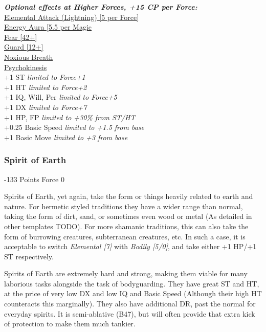 \begin{multicols*}{3}
	\textbf{\textit{Optional effects at Higher Forces, +15 CP per Force:\\}}
	\hyperref[elemental_attack]{Elemental Attack (Lightning) [5 per Force]}\\
	\hyperref[energy_aura]{Energy Aura [5.5 per Magic}\\
	\hyperref[fear]{Fear [42+]}\\
	\hyperref[guard]{Guard [12+]}\\
	\hyperref[noxious_breath]{Noxious Breath}\\
	\hyperref[psychokinesis]{Psychokinesis}\\
	
	+1 ST \textit{limited to Force+1}\\
	+1 HT \textit{limited to Force+2}\\
	+1 IQ, Will, Per \textit{limited to Force+5}\\
	+1 DX \textit{limited to Force+7}\\
	+1 HP, FP \textit{limited to +30\% from ST/HT}\\
	+0.25 Basic Speed \textit{limited to +1.5 from base}\\
	+1 Basic Move \textit{limited to +3 from base}\\
	
	
	\subsubsection{Spirit of Earth}
	\begin{flushright}
		-133 Points Force 0
	\end{flushright}
	
	Spirits of Earth, yet again, take the form or things heavily related to earth and nature. For hermetic styled traditions they have a wider range than normal, taking the form of dirt, sand, or sometimes even wood or metal (As detailed in other templates TODO). For more shamanic traditions, this can also take the form of burrowing creatures, subterranean creatures, etc. In such a case, it is acceptable to switch \textit{Elemental [7]} with \textit{Bodily [5/0]}, and take either +1 HP/+1 ST respectively.
	
	Spirits of Earth are extremely hard and strong, making them viable for many laborious tasks alongside the task of bodyguarding. They have great ST and HT, at the price of very low DX and low IQ and Basic Speed (Although their high HT counteracts this marginally). They also have additional DR, past the normal for everyday spirits. It is semi-ablative (B47), but will often provide that extra kick of protection to make them much tankier.
	

\end{multicols*}
